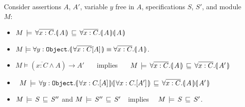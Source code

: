 \begin{lemma}
Consider assertions $A$, $A'$, variable $y$ free in $A$, specifications $S$, $S'$, and module $M$:
\begin{itemize} [topsep=6pt,itemsep=5pt,parsep=0pt,partopsep=0pt]
\item
$\stronger M {\OneStateQ {\overline {x:C}}  {A}}  {\TwoStatesQ {\overline {x:C}} {A}{A}} $ 
    \item
 $\strongerEq  M  {\OneStateQ    {y:\prg{Object}}   {\forall \overline {x:C}[ A ] } } 
    {\OneStateQ {\overline {x:C}}  {A}} $.
\item
$  M  \models (  \overline {x:C} \wedge A) \rightarrow A'$ \ \ \  implies \ \  \ $\stronger M  {\OneStateQ {\overline {x:C}} {A}}    {\OneStateQ {\overline {x:C}} {A'}}$
\item
  \ $\stronger M  { \TwoStatesQ {y:\prg{Object}}  {\forall x:C.[A]} {\forall x:C.[A']} }    {\TwoStatesQ {\overline {x:C}} {A}{A'}} $

\item
$\stronger M  S {S''}$ and $\stronger M {S''} {S'}$\ \  implies \ \ $\stronger M S  {S'}$.
\end{itemize}

\end{lemma}




